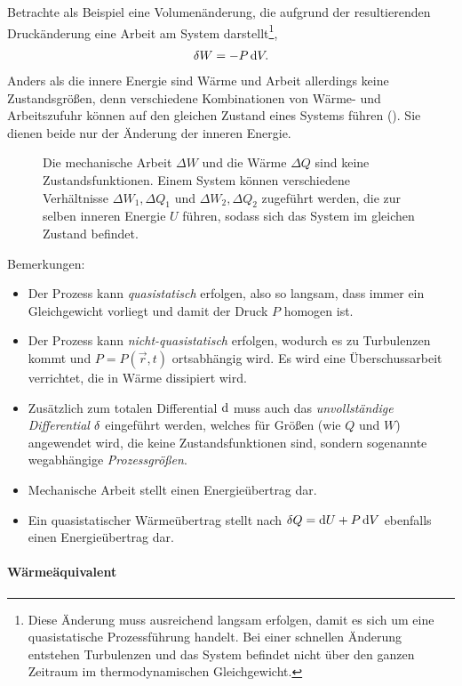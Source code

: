 Betrachte als Beispiel eine Volumenänderung, die aufgrund der resultierenden Druckänderung eine Arbeit am System darstellt\footnote{Diese Änderung muss ausreichend langsam erfolgen, damit es sich um eine quasistatische Prozessführung handelt. Bei einer schnellen Änderung entstehen Turbulenzen und das System befindet nicht über den ganzen Zeitraum im thermodynamischen Gleichgewicht.},
\begin{align*}
    \mathop{}\!\delta W = -P\mathop{}\!\mathrm{d} V.
\end{align*}
Anders als die innere Energie sind Wärme und Arbeit allerdings keine Zustandsgrößen, denn verschiedene Kombinationen von Wärme- und Arbeitszufuhr können auf den gleichen Zustand eines Systems führen (). Sie dienen beide nur der Änderung der inneren Energie.

\begin{figure}[htb]
    \centering
    \tfigWQAreNoStateFunctions
    \caption{Die mechanische Arbeit $\Delta W$ und die Wärme $\Delta Q$ sind keine Zustandsfunktionen. Einem System können verschiedene Verhältnisse $\Delta W_1,\Delta Q_1$ und $\Delta W_2,\Delta Q_2$ zugeführt werden, die zur selben inneren Energie $U$ führen, sodass sich das System im gleichen Zustand befindet. }
    \label{fig:WQAreNoStateFunctions}
\end{figure}


Bemerkungen:
\begin{itemize}
    \item Der Prozess kann \emph{quasistatisch} erfolgen, also so langsam, dass immer ein Gleichgewicht vorliegt und damit der Druck $P$ homogen ist.
    \item Der Prozess kann \emph{nicht-quasistatisch} erfolgen, wodurch es zu Turbulenzen kommt und $P=P(\vec r,t)$ ortsabhängig wird. Es wird eine Überschussarbeit verrichtet, die in Wärme dissipiert wird.
    \item Zusätzlich zum totalen Differential $\mathop{}\!\mathrm{d}$ muss auch das \emph{unvollständige Differential} $\mathop{}\!\delta$ eingeführt werden, welches für Größen (wie $Q$ und $W$) angewendet wird, die keine Zustandsfunktionen sind, sondern sogenannte wegabhängige \emph{Prozessgrößen}.
    \item Mechanische Arbeit stellt einen Energieübertrag dar.
    \item Ein quasistatischer Wärmeübertrag stellt nach $\mathop{}\!\delta Q=\mathop{}\!\mathrm{d} U+P\mathop{}\!\mathrm{d} V$ ebenfalls einen Energieübertrag dar.
\end{itemize}


\paragraph*{Wärmeäquivalent}

